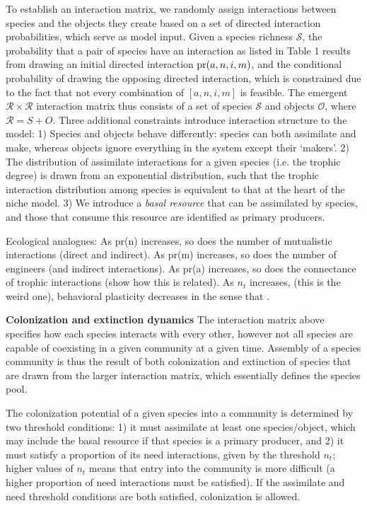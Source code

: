 \documentclass[twocolumn,preprintnumbers,amsmath,amssymb,superscriptaddress]{revtex4-1}
\begin{document}
To establish an interaction matrix, we randomly assign interactions between species and the objects they create based on a set of directed interaction probabilities, which serve as model input. 
Given a species richness $\mathcal S$, the probability that a pair of species have an interaction as listed in Table 1 results from drawing an initial directed interaction ${\rm pr}(a,n,i,m)$, and the conditional probability of drawing the opposing directed interaction, which is constrained due to the fact that not every combination of $[a,n,i,m]$ is feasible.
The emergent $\mathcal R \times \mathcal R$ interaction matrix thus consists of a set of species $\mathcal S$ and objects $\mathcal O$, where $\mathcal R = S + O$. 
Three additional constraints introduce interaction structure to the model:
1) Species and objects behave differently: species can both assimilate and make, whereas objects ignore everything in the system except their `makers'.
2) The distribution of assimilate interactions for a given species (i.e. the trophic degree) is drawn from an exponential distribution, such that the trophic interaction distribution among species is equivalent to that at the heart of the niche model.
3) We introduce a \emph{basal resource} that can be assimilated by species, and those that consume this resource are identified as primary producers.


Ecological analogues: 
As pr(n) increases, so does the number of mutualistic interactions (direct and indirect).
As pr(m) increases, so does the number of engineers (and indirect interactions).
As pr(a) increases, so does the connectance of trophic interactions (show how this is related).
As $n_t$ increases, (this is the weird one), behavioral plasticity decreases in the sense that .


{\bf Colonization and extinction dynamics}
The interaction matrix above specifies how each species interacts with every other, however not all species are capable of coexisting in a given community at a given time.
Assembly of a species community is thus the result of both colonization and extinction of species that are drawn from the larger interaction matrix, which essentially defines the species pool.

The colonization potential of a given species into a community is determined by two threshold conditions:
1) it must assimilate at least one species/object, which may include the basal resource if that species is a primary producer, and
2) it must satisfy a proportion of its need interactions, given by the threshold $n_t$; higher values of $n_t$ means that entry into the community is more difficult (a higher proportion of need interactions must be satisfied).
If the assimilate and need threshold conditions are both satisfied, colonization is allowed.
\end{document}
